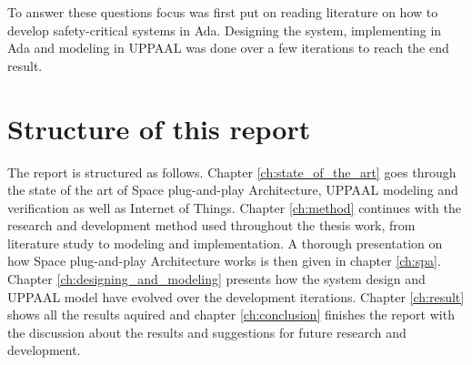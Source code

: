To answer these questions focus was first put on reading literature on how
to develop safety-critical systems in Ada. Designing the system, implementing
in Ada and modeling in UPPAAL was done over a few iterations to reach the end
result.

\section{Structure of this report}
The report is structured as follows. Chapter \ref{ch:state_of_the_art} goes
through the state of the art of Space plug-and-play Architecture, UPPAAL
modeling and verification as well as Internet of Things.  Chapter
\ref{ch:method} continues with the research and development
method used throughout the thesis work, from literature study to modeling and
implementation. A thorough presentation on how Space plug-and-play Architecture
works is then given in chapter \ref{ch:spa}. Chapter
\ref{ch:designing_and_modeling} presents how the system design and UPPAAL
model have evolved over the development iterations. Chapter \ref{ch:result}
shows all the results aquired and chapter \ref{ch:conclusion} finishes the
report with the discussion about the results and suggestions for future
research and development.

